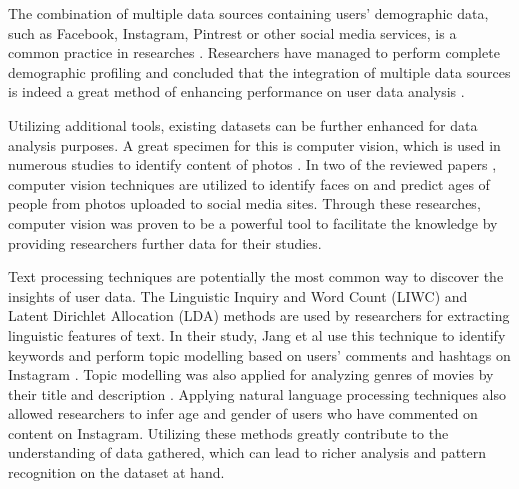   The combination of multiple data sources containing users' demographic data, such as Facebook, Instagram, Pintrest or other social media services, is a common practice in researches \cite{farseev2015harvestingmultiplesources, ottoni2013ladies}. Researchers have managed to perform complete demographic profiling and concluded that the integration of multiple data sources is indeed a great method of enhancing performance on user data analysis \cite{farseev2015harvestingmultiplesources}. 
  
  Utilizing additional tools, existing datasets can be further enhanced for data analysis purposes. A great specimen for this is computer vision, which is used in numerous studies to identify content of photos \cite{hu2014we, farseev2015harvestingmultiplesources}. In two of the reviewed papers \cite{han2016teensarefrommars, bakhshi2014faces}, computer vision techniques are utilized to identify faces on and predict ages of people from photos uploaded to social media sites. Through these researches, computer vision was proven to be a powerful tool to facilitate the knowledge by providing researchers further data for their studies. 

  Text processing techniques are potentially the most common way to discover the insights of user data. The Linguistic Inquiry and Word Count (LIWC) and Latent Dirichlet Allocation (LDA) methods are used by researchers \cite{ottoni2013ladies, farseev2015harvestingmultiplesources, jang2016teensengagemorewithfewerphotos} for extracting linguistic features of text. In their study, Jang et al use this technique to identify keywords and perform topic modelling based on users' comments and hashtags on Instagram \cite{jang2016teensengagemorewithfewerphotos}. Topic modelling was also applied for analyzing genres of movies by their title and description \cite{kabinsingha2012movie}. Applying natural language processing techniques also allowed researchers to infer age and gender of users \cite{han2016teensarefrommars} who have commented on content on Instagram. Utilizing these methods greatly contribute to the understanding of data gathered, which can lead to richer analysis and pattern recognition on the dataset at hand. 

